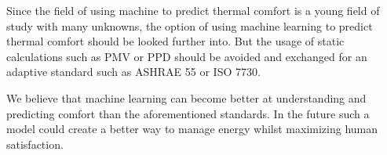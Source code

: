 \documentclass[12pt,a4paper]{article}
\begin{document}
Since the field of using machine to predict thermal comfort is a young field of study with many unknowns, the option of using machine learning to predict thermal comfort should be looked further into. But the usage of static calculations such as PMV or PPD should be avoided and exchanged for an adaptive standard such as ASHRAE 55 or ISO 7730.

We believe that machine learning can become better at understanding and predicting comfort than the aforementioned standards. In the future such a model could create a better way to manage energy whilst maximizing human satisfaction.


\pagebreak

\printbibliography
\end{document}
